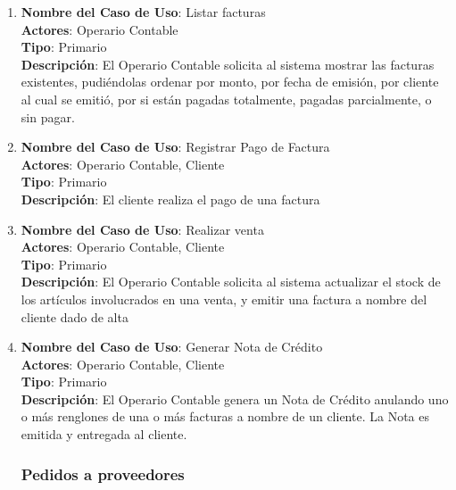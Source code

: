 \documentclass[12pt]{extarticle}
\begin{document}
\begin{spacing}{1.2}
\begin{enumerate}
            \item 	\textbf{Nombre del Caso de Uso}: Listar facturas\\
                    \textbf{Actores}: Operario Contable\\
                    \textbf{Tipo}: Primario\\
                    \textbf{Descripción}: El Operario Contable solicita al sistema mostrar las facturas existentes, pudiéndolas ordenar por monto, por fecha de emisión, por cliente al cual se emitió, por si están pagadas totalmente, pagadas parcialmente, o sin pagar.

            \item 	\textbf{Nombre del Caso de Uso}: Registrar Pago de Factura\\
                    \textbf{Actores}: Operario Contable, Cliente\\
                    \textbf{Tipo}: Primario\\
                    \textbf{Descripción}: El cliente realiza el pago de una factura
            
            \item 	\textbf{Nombre del Caso de Uso}: Realizar venta\\
                    \textbf{Actores}: Operario Contable, Cliente\\
                    \textbf{Tipo}: Primario\\
                    \textbf{Descripción}: El Operario Contable solicita al sistema actualizar el stock de los artículos involucrados en una venta, y emitir una factura a nombre del cliente dado de alta

            \item 	\textbf{Nombre del Caso de Uso}: Generar Nota de Crédito\\
                    \textbf{Actores}: Operario Contable, Cliente\\
                    \textbf{Tipo}: Primario\\
                    \textbf{Descripción}: El Operario Contable genera un Nota de Crédito anulando uno o más renglones de una o más facturas a nombre de un cliente. La Nota es emitida y entregada al cliente.



            \subsubsection{Pedidos a proveedores}




\end{enumerate}
\end{spacing}
\end{document}
